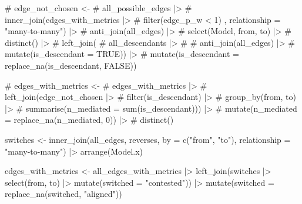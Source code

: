 \documentclass[
  letterpaper,
  DIV=11,
  numbers=noendperiod]{scrartcl}
\newenvironment{Shaded}{\begin{snugshade}}{\end{snugshade}}
\newcommand{\AttributeTok}[1]{\textcolor[rgb]{0.40,0.45,0.13}{#1}}
\newcommand{\CommentTok}[1]{\textcolor[rgb]{0.37,0.37,0.37}{#1}}
\newcommand{\FunctionTok}[1]{\textcolor[rgb]{0.28,0.35,0.67}{#1}}
\newcommand{\NormalTok}[1]{\textcolor[rgb]{0.00,0.23,0.31}{#1}}
\newcommand{\OtherTok}[1]{\textcolor[rgb]{0.00,0.23,0.31}{#1}}
\newcommand{\SpecialCharTok}[1]{\textcolor[rgb]{0.37,0.37,0.37}{#1}}
\newcommand{\StringTok}[1]{\textcolor[rgb]{0.13,0.47,0.30}{#1}}
\begin{document}
\begin{Shaded}
\begin{Highlighting}[]
\CommentTok{\# edge\_not\_chosen \textless{}{-} }
\CommentTok{\#     all\_possible\_edges |\textgreater{} }
\CommentTok{\#     inner\_join(edges\_with\_metrics |\textgreater{} }
\CommentTok{\#                    filter(edge\_p\_w \textless{} 1) , relationship = "many{-}to{-}many") |\textgreater{} }
\CommentTok{\#     anti\_join(all\_edges) |\textgreater{} }
\CommentTok{\#     select(Model, from, to) |\textgreater{} }
\CommentTok{\#     distinct() |\textgreater{} }
\CommentTok{\#     left\_join(}
\CommentTok{\#         all\_descendants |\textgreater{} }
\CommentTok{\#             \# anti\_join(all\_edges) |\textgreater{} }
\CommentTok{\#             mutate(is\_descendant = TRUE)) |\textgreater{} }
\CommentTok{\#     mutate(is\_descendant = replace\_na(is\_descendant, FALSE))}

\CommentTok{\# edges\_with\_metrics \textless{}{-} }
\CommentTok{\#     edges\_with\_metrics |\textgreater{} }
\CommentTok{\#     left\_join(edge\_not\_chosen |\textgreater{}}
\CommentTok{\#                   filter(is\_descendant) |\textgreater{} }
\CommentTok{\#                   group\_by(from, to) |\textgreater{} }
\CommentTok{\#                   summarise(n\_mediated = sum(is\_descendant))) |\textgreater{} }
\CommentTok{\#     mutate(n\_mediated = replace\_na(n\_mediated, 0)) |\textgreater{} }
\CommentTok{\#     distinct()}

\NormalTok{switches }\OtherTok{\textless{}{-}} \FunctionTok{inner\_join}\NormalTok{(all\_edges, reverses, }\AttributeTok{by =} \FunctionTok{c}\NormalTok{(}\StringTok{"from"}\NormalTok{, }\StringTok{"to"}\NormalTok{),}
                       \AttributeTok{relationship =} \StringTok{"many{-}to{-}many"}\NormalTok{) }\SpecialCharTok{|\textgreater{}} 
    \FunctionTok{arrange}\NormalTok{(Model.x)}

\NormalTok{edges\_with\_metrics }\OtherTok{\textless{}{-}} 
\NormalTok{    all\_edges\_with\_metrics }\SpecialCharTok{|\textgreater{}} 
    \FunctionTok{left\_join}\NormalTok{(switches }\SpecialCharTok{|\textgreater{}} 
                  \FunctionTok{select}\NormalTok{(from, to) }\SpecialCharTok{|\textgreater{}} \FunctionTok{mutate}\NormalTok{(}\AttributeTok{switched =} \StringTok{"contested"}\NormalTok{)) }\SpecialCharTok{|\textgreater{}} 
    \FunctionTok{mutate}\NormalTok{(}\AttributeTok{switched =} \FunctionTok{replace\_na}\NormalTok{(switched, }\StringTok{"aligned"}\NormalTok{))}
\end{Highlighting}
\end{Shaded}
\end{document}
